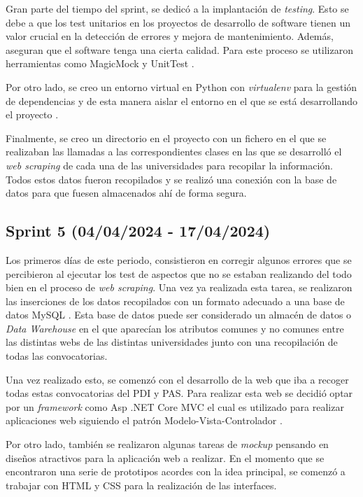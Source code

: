 Gran parte del tiempo del sprint, se dedicó a la implantación de \textit{testing}. Esto se debe a que los test unitarios en los proyectos de desarrollo de software tienen un valor crucial en la detección de errores y mejora de mantenimiento. Además, aseguran que el software tenga una cierta calidad. Para este proceso se utilizaron herramientas como MagicMock y UnitTest \cite{unittest:latex}.

Por otro lado, se creo un entorno virtual en Python con \textit{virtualenv} para la gestión de dependencias y de esta manera aislar el entorno en el que se está desarrollando el proyecto \cite{virtualenv:latex}.

Finalmente, se creo un directorio en el proyecto con un fichero en el que se realizaban las llamadas a las correspondientes clases en las que se desarrolló el \textit{web scraping} de cada una de las universidades para recopilar la información. Todos estos datos fueron recopilados y se realizó una conexión con la base de datos para que fuesen almacenados ahí de forma segura.


\subsection{Sprint 5 (04/04/2024 -
17/04/2024)}
Los primeros días de este periodo, consistieron en corregir algunos errores que se percibieron al ejecutar los test de aspectos que no se estaban realizando del todo bien en el proceso de \textit{web scraping}. Una vez ya realizada esta tarea, se realizaron las inserciones de los datos recopilados con un formato adecuado a una base de datos MySQL \cite{mysqlpython:latex}. Esta base de datos puede ser considerado un almacén de datos o \textit{Data Warehouse} en el que aparecían los atributos comunes y no comunes entre las distintas webs de las distintas universidades junto con una recopilación de todas las convocatorias.

Una vez realizado esto, se comenzó con el desarrollo de la web que iba a recoger todas estas convocatorias del PDI y PAS. Para realizar esta web se decidió optar por un \textit{framework} como Asp .NET Core MVC el cual es utilizado para realizar aplicaciones web siguiendo el patrón Modelo-Vista-Controlador \cite{aspnetcore:latex}.

Por otro lado, también se realizaron algunas tareas de \textit{mockup} pensando en diseños atractivos para la aplicación web a realizar. En el momento que se encontraron una serie de prototipos acordes con la idea principal, se comenzó a trabajar con HTML y CSS para la realización de las interfaces.

